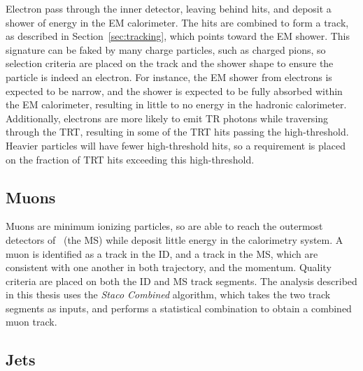 Electron pass through the inner detector, leaving behind hits, and deposit a
shower of energy in the EM calorimeter.
The hits are combined to form a track, as described in
Section~\ref{sec:tracking}, which points toward the EM shower.
This signature can be faked by many charge particles, such as charged pions, so
selection criteria are placed on the track and the shower shape to ensure the
particle is indeed an electron.
For instance, the EM shower from electrons is expected to be narrow, and the
shower is expected to be fully absorbed within the EM calorimeter, resulting in
little to no energy in the hadronic calorimeter.
Additionally, electrons are more likely to emit TR photons while traversing
through the TRT, resulting in some of the TRT hits passing the high-threshold.
Heavier particles will have fewer high-threshold hits, so a requirement is
placed on the fraction of TRT hits exceeding this high-threshold.

\FloatBarrier
\subsection{Muons} 
\label{sec:muons}

Muons are minimum ionizing particles, so are able to reach the outermost
detectors of \atlas\ (the MS) while deposit little energy in the calorimetry
system.
A muon is identified as a track in the ID, and a track in the MS, which are
consistent with one another in both trajectory, and the momentum.
Quality criteria are placed on both the ID and MS track segments.
The analysis described in this thesis uses the \textit{Staco Combined}
algorithm, which takes the two track segments as inputs, and performs
a statistical combination to obtain a combined muon track.

\FloatBarrier
\subsection{Jets} 
\label{sec:jets}


